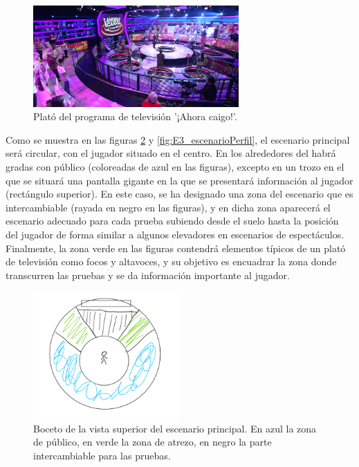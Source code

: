 \begin{figure}
  \centering
    \includegraphics[width=0.7\textwidth]{04.Desarrollo/03.Entrega3/01.Iteracion3_1/00.Figuras/02.ahora_caigo.png}
    \caption{Plató del programa de televisión '¡Ahora caigo!'. \cite{AI_img_ahoraCaigo}}
    \label{fig:E3_ahoraCaigo}
\end{figure}




Como se muestra en las figuras \ref{fig:E3_escenarioArriba} y \ref{fig:E3_escenarioPerfil}, el escenario principal será circular, con el jugador situado en el centro. En los alrededores del habrá gradas con público (coloreadas de azul en las figuras), excepto en un trozo en el que se situará una pantalla gigante en la que se presentará información al jugador (rectángulo superior). En este caso, se ha designado una zona del escenario que es intercambiable (rayada en negro en las figuras), y en dicha zona aparecerá el escenario adecuado para cada prueba subiendo desde el suelo hasta la posición del jugador de forma similar a algunos elevadores en escenarios de espectáculos. Finalmente, la zona verde en las figuras contendrá elementos típicos de un plató de televisión como focos y altavoces, y su objetivo es encuadrar la zona donde transcurren las pruebas y se da información importante al jugador.


\begin{figure}
  \centering
    \includegraphics[width=0.5\textwidth]{04.Desarrollo/03.Entrega3/01.Iteracion3_1/00.Figuras/03.boceto_escenario_arriba.png}
    \caption{Boceto de la vista superior del escenario principal. En azul la zona de público, en verde la zona de atrezo, en negro la parte intercambiable para las pruebas.}
    \label{fig:E3_escenarioArriba}
\end{figure}

